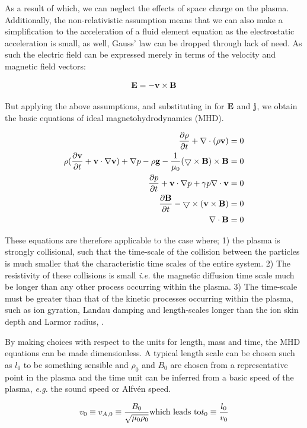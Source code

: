 As a result of which, we can neglect the effects of space charge on the plasma.
Additionally, the non-relativistic assumption means that we can also make a simplification to the acceleration of a fluid element equation as the electrostatic acceleration is small, as well, Gauss' law can be dropped through lack of need.
As such the electric field can be expressed merely in terms of the velocity and magnetic field vectors:

\begin{equation}
	\mathbf{E} = -\mathbf{v} \times \mathbf{B}
\end{equation}

But applying the above assumptions, and substituting in for $\mathbf{E}$ and $\mathbf{j}$, we obtain the basic equations of ideal magnetohydrodynamics (MHD).

\begin{align}
	\frac{\partial \rho}{\partial t } + \nabla\cdot(\rho\mathbf{v}) &= 0 \\
	\rho(\frac{\partial \mathbf{v}}{\partial t } + \mathbf{v}\cdot\nabla\mathbf{v}) + \nabla p - \rho\mathbf{g} - \frac{1}{\mu_0}(\bigtriangledown \times \mathbf{B}) \times \mathbf{B} &= 0\\
	\frac{\partial p}{\partial t } + \mathbf{v}\cdot\nabla p + \gamma p\nabla\cdot\mathbf{v} &= 0\\
	\frac{\partial \mathbf{B}}{\partial t } - \bigtriangledown \times (\mathbf{v} \times \mathbf{B}) &= 0\\
	\nabla\cdot\mathbf{B} &= 0
\end{align}

\noindent These equations are therefore applicable to the case where; 1) the plasma is strongly collisional, such that the time-scale of the collision between the particles is much smaller that the characteristic time scales of the entire system.
2) The resistivity of these collisions is small \emph{i.e.} the magnetic diffusion time scale much be longer than any other process occurring within the plasma.
3) The time-scale must be greater than that of the kinetic processes occurring within the plasma, such as ion gyration, Landau damping and length-scales longer than the ion skin depth and Larmor radius, \cite{Goedbloed2004}.

By making choices with respect to the units for length, mass and time, the MHD equations can be made dimensionless.
A typical length scale can be chosen such as $l_0$ to be something sensible and $\rho_0$ and $B_0$ are chosen from a representative point in the plasma and the time unit can be inferred from a basic speed of the plasma, \emph{e.g.} the sound speed or Alfv{\'e}n speed.

\begin{equation}
	v_0 \equiv v_{A,0} \equiv \frac{B_0}{\sqrt{\mu_0\rho_0}} \textnormal{which leads to} t_0 \equiv \frac{l_0}{v_0} 
\end{equation}

